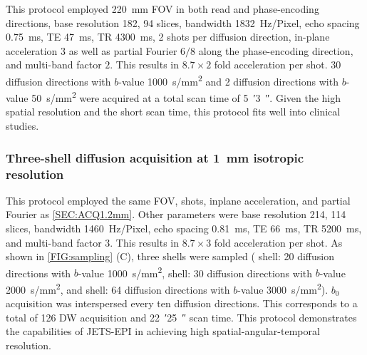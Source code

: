 \documentclass[preprint,12pt,authoryear,review]{elsarticle}
\begin{document}

	This protocol employed \SI{220}{\milli\meter} FOV in both read and phase-encoding directions,
	base resolution 182, 94 slices, bandwidth \SI{1832}{Hz/Pixel},
	echo spacing \SI{0.75}{ms}, TE \SI{47}{ms}, TR \SI{4300}{ms},
	2 shots per diffusion direction,
	in-plane acceleration $3$ as well as partial Fourier $6/8$ along the phase-encoding direction,
	and multi-band factor $2$. This results in $8.7 \times 2$ fold acceleration per shot.
	30 diffusion directions with $b$-value \SI{1000}{s/mm^2} and
	2 diffusion directions with $b$-value \SI{50}{s/mm^2} were acquired
	at a total scan time of \SI{5}{\arcminute}\SI{3}{\arcsecond}.
        Given the high spatial resolution and the short scan time,
        this protocol fits well into clinical studies.

	\subsubsection{Three-shell diffusion acquisition at \SI{1}{\milli\meter} isotropic resolution}
	\label{SEC:ACQ1.0mm}
	This protocol employed the same FOV, shots,
	inplane acceleration, and partial Fourier as \cref{SEC:ACQ1.2mm}.
	Other parameters were base resolution 214, 114 slices, bandwidth \SI{1460}{Hz/Pixel},
	echo spacing \SI{0.81}{\milli\second}, TE \SI{66}{\milli\second}, TR \SI{5200}{ms},
	and multi-band factor $3$. This results in $8.7 \times 3$ fold acceleration per shot.
	As shown in \cref{FIG:sampling} (C), three shells were sampled
        ( shell: 20 diffusion directions with $b$-value \SI{1000}{s/mm^2},
         shell: 30 diffusion directions with $b$-value \SI{2000}{s/mm^2}, and
         shell: 64 diffusion directions with $b$-value \SI{3000}{s/mm^2}).
	$b_0$ acquisition was interspersed every ten diffusion directions.
	This corresponds to a total of 126 DW acquisition and
	\SI{22}{\arcminute}\SI{25}{\arcsecond} scan time.
        This protocol demonstrates the capabilities of JETS-EPI in achieving high
        spatial-angular-temporal resolution.
\end{document}
